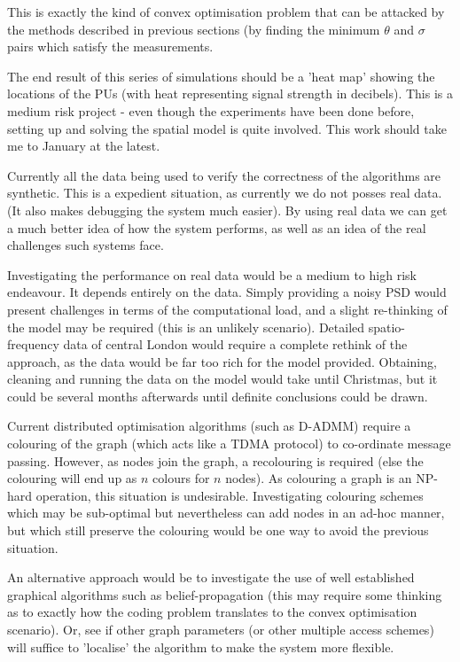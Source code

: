 This is exactly the kind of convex optimisation problem that can be attacked by the methods described in previous sections (by finding the minimum \(\theta\) and \(\sigma\) pairs which satisfy the measurements.

The end result of this series of simulations should be a 'heat map' showing the locations of the PUs (with heat representing signal strength in decibels). This is a medium risk project - even though the experiments have been done before, setting up and solving the spatial model is quite involved. This work should take me to January at the latest. 

Currently all the data being used to verify the correctness of the algorithms are synthetic. This is a  expedient situation, as currently we do not posses real data. (It also makes debugging the system much easier). By using real data we can get a much better idea of how the system performs, as well as an idea of the real challenges such systems face. 

Investigating the performance on real data would be a medium to high risk endeavour. It depends entirely on the data. Simply providing a noisy PSD would present challenges in terms of the computational load, and a slight re-thinking of the model may be required (this is an unlikely scenario). Detailed spatio-frequency data of central London would require a complete rethink of the approach, as the data would be far too rich for the model provided. Obtaining, cleaning and running the data on the model would take until Christmas, but it could be several months afterwards until definite conclusions could be drawn. 

Current distributed optimisation algorithms (such as D-ADMM) require a colouring of the graph (which acts like a TDMA protocol) to co-ordinate message passing. However, as nodes join the graph, a recolouring is required (else the colouring will end up as \(n\) colours for \(n\) nodes). As colouring a graph is an NP-hard operation, this situation is undesirable. Investigating colouring schemes which may be sub-optimal but nevertheless can add nodes in an ad-hoc manner, but which still preserve the colouring would be one way to avoid the previous situation.

An alternative approach would be to investigate the use of well established graphical algorithms such as belief-propagation (this may require some thinking as to exactly how the coding problem translates to the convex optimisation scenario). Or, see if other graph parameters (or other multiple access schemes) will suffice to 'localise' the algorithm to make the system more flexible. 


